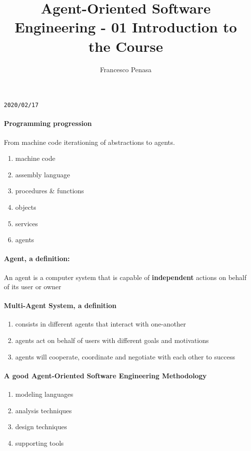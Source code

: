 \documentclass[11pt]{article}
\begin{document}
\author{Francesco Penasa}
\title{Agent-Oriented Software Engineering - 01 Introduction to the Course}
\maketitle

\medskip

\texttt{2020/02/17}
\paragraph{Programming progression} %
\label{par:programming_progression}
From machine code iterationing of abstractions to agents. 
\begin{enumerate}
	\item machine code
	\item assembly language
	\item procedures \& functions
	\item objects
	\item services
	\item agents
\end{enumerate}

\paragraph{Agent, a definition:} %
\label{par:agent_a_definition_}
An agent is a computer system that is capable of \textbf{independent} actions on behalf of its user or owner

\paragraph{Multi-Agent System, a definition} %
\label{par:multi_agent_system_a_definition}
\begin{enumerate}
	\item consists in different agents that interact with one-another
	\item agents act on behalf of users with different goals and motivations
	\item agents will cooperate, coordinate and negotiate with each other to success
\end{enumerate}

\paragraph{A good Agent-Oriented Software Engineering Methodology} %
\label{par:a_good_agent_oriented_software_engineering_methodology}
\begin{enumerate}
	\item modeling languages
	\item analysis techniques
	\item design techniques
	\item supporting tools
\end{enumerate}
\end{document}
